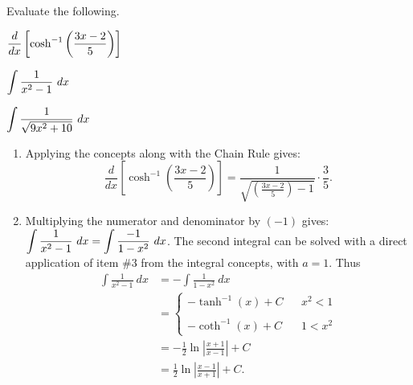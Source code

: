 \begin{example} \label{eg:6.8.3} %
Evaluate the following.

\begin{enumerate*}[1)]
\item	$\displaystyle \frac{d}{dx}\left[\cosh^{-1}\left(\frac{3x-2}{5}\right)\right]$ \hspace{.25cm}
\item	$\displaystyle \int\frac{1}{x^2-1}\ dx$ \hspace{.25cm}
\item	$\ds \int \frac{1}{\sqrt{9x^2+10}}\ dx$
\end{enumerate*}

\solution
\begin{enumerate}[1)]
\item	 Applying the concepts along with the Chain Rule gives:
$$\frac{d}{dx}\left[\cosh^{-1}\left(\frac{3x-2}5\right)\right] = \frac{1}{\sqrt{\left(\frac{3x-2}5\right)-1}}\cdot\frac35.$$

\item Multiplying the numerator and denominator by $(-1)$ gives: $\displaystyle \int \frac{1}{x^2-1}\ dx = \int \frac{-1}{1-x^2}\ dx$. The second integral can be solved with a direct application of item \#3 from the integral concepts, with $a=1$. Thus
\begin{align*}
\int \frac{1}{x^2-1}\ dx &= -\int \frac{1}{1-x^2}\ dx  \\
&= \left\{\begin{array}{ccc} -\tanh^{-1}\left(x\right)+C & & x^2<1 \\ \\ -\coth^{-1}\left(x\right)+C & & 1<x^2 \end{array}\right. \\
&=-\frac12\ln\left|\frac{x+1}{x-1}\right|+C\\
&=\frac12\ln\left|\frac{x-1}{x+1}\right|+C.
\end{align*}


\end{enumerate}
\end{example}
